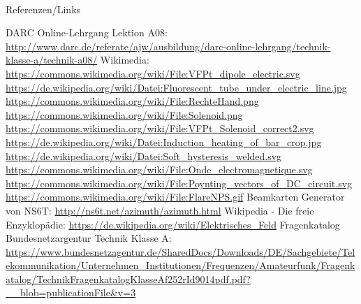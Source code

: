 \renewcommand{\refname}{Referenzen}

\hypertarget{refs}{}
\textcolor{white}{} \\ %
\Large Referenzen/Links
\footnotesize

\begin{thebibliography}{}
      DARC Online-Lehrgang Lektion A08:
                    \url{http://www.darc.de/referate/ajw/ausbildung/darc-online-lehrgang/technik-klasse-a/technik-a08/}
     	Wikimedia:
                    \url{https://commons.wikimedia.org/wiki/File:VFPt_dipole_electric.svg}
                    \url{https://de.wikipedia.org/wiki/Datei:Fluorescent_tube_under_electric_line.jpg}
                    \url{https://commons.wikimedia.org/wiki/File:RechteHand.png}
                    \url{https://commons.wikimedia.org/wiki/File:Solenoid.png}
                    \url{https://commons.wikimedia.org/wiki/File:VFPt_Solenoid_correct2.svg}
                    \url{https://de.wikipedia.org/wiki/Datei:Induction_heating_of_bar_crop.jpg}
                    \url{https://de.wikipedia.org/wiki/Datei:Soft_hysteresis_welded.svg}
                    \url{https://commons.wikimedia.org/wiki/File:Onde_electromagnetique.svg}
                    \url{https://commons.wikimedia.org/wiki/File:Poynting_vectors_of_DC_circuit.svg}
                    \url{https://commons.wikimedia.org/wiki/File:FlareNPS.gif}
                    \url{}
                    \url{}
                    \url{}
                    \url{}
      Beamkarten Generator von NS6T:
                    \url{http://ns6t.net/azimuth/azimuth.html}
        Wikipedia - Die freie Enzyklopädie:
                    \url{https://de.wikipedia.org/wiki/Elektrisches_Feld}
	   Fragenkatalog Bundesnetzargentur Technik Klasse A:                   
                    \url{https://www.bundesnetzagentur.de/SharedDocs/Downloads/DE/Sachgebiete/Telekommunikation/Unternehmen_Institutionen/Frequenzen/Amateurfunk/Fragenkatalog/TechnikFragenkatalogKlasseAf252rId9014pdf.pdf?__blob=publicationFile&v=3}
\end{thebibliography} 


